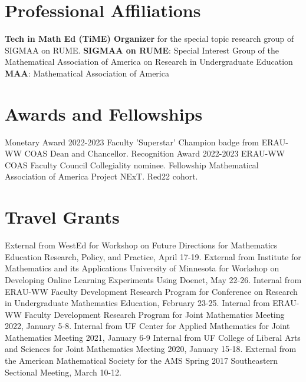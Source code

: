 \documentclass[10pt,a4paper,sans]{moderncv}
\begin{document}


\section{Professional Affiliations}
		{\textbf{Tech in Math Ed (TiME) Organizer} for the special topic research group of SIGMAA on RUME.}
		{\textbf{SIGMAA on RUME}: Special Interest Group of the Mathematical Association of America on Research in Undergraduate Education}
		{\textbf{MAA}: Mathematical Association of America} 

\section{Awards and Fellowships}
		{Monetary Award}
		{}
		{2022-2023 Faculty 'Superstar' Champion badge from ERAU-WW COAS Dean and Chancellor.}
		{}{}
		{Recognition Award}
		{}
		{2022-2023 ERAU-WW COAS Faculty Council Collegiality nominee.}
		{}{}
		{Fellowship}
		{}
		{Mathematical Association of America Project NExT. Red22 cohort.}
	{}{}
\section{Travel Grants}
		{External}
		{}
		{from WestEd for Workshop on Future Directions for Mathematics Education Research, Policy, and Practice, April 17-19.}
		{}{}
		{External}
		{}
		{from Institute for Mathematics and its Applications University of Minnesota for Workshop on Developing Online Learning Experiments Using Doenet, May 22-26.}
		{}{}
		{Internal}
		{}
		{from ERAU-WW Faculty Development Research Program for Conference on Research in Undergraduate Mathematics Education, February 23-25.}
		{}{}
		{Internal}
		{}
		{from ERAU-WW Faculty Development Research Program for Joint Mathematics Meeting 2022, January 5-8.}
		{}{}
		{Internal}
		{}
		{from UF Center for Applied Mathematics for Joint Mathematics Meeting 2021, January 6-9}
		{}{}
		{Internal}
		{}
		{from UF College of Liberal Arts and Sciences for Joint Mathematics Meeting 2020, January 15-18.}
		{}{}
		{External}
		{}
		{from the American Mathematical Society for the AMS Spring 2017 Southeastern Sectional Meeting, March 10-12.}
		{}{}
\end{document}
